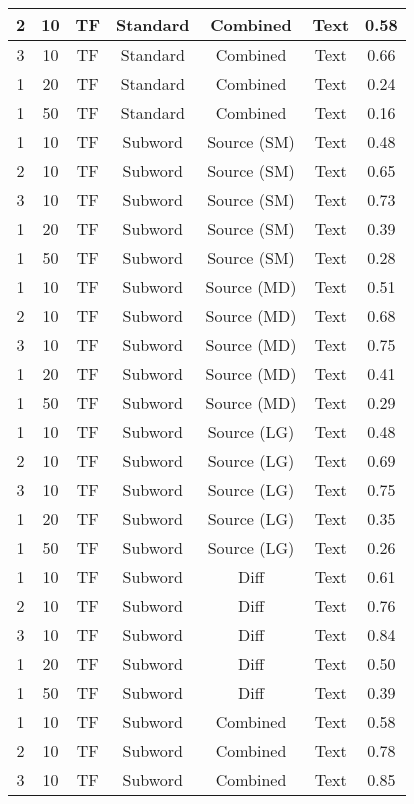 \begin{longtable}{|c|c|c|c|c|c|c|}
\hline
2 & 10 & TF & Standard & Combined & Text & 0.58 \\
\hline
3 & 10 & TF & Standard & Combined & Text & 0.66 \\
\hline
1 & 20 & TF & Standard & Combined & Text & 0.24 \\
\hline
1 & 50 & TF & Standard & Combined & Text & 0.16 \\
\hline
1 & 10 & TF & Subword & Source (SM) & Text & 0.48 \\
\hline
2 & 10 & TF & Subword & Source (SM) & Text & 0.65 \\
\hline
3 & 10 & TF & Subword & Source (SM) & Text & 0.73 \\
\hline
1 & 20 & TF & Subword & Source (SM) & Text & 0.39 \\
\hline
1 & 50 & TF & Subword & Source (SM) & Text & 0.28 \\
\hline
1 & 10 & TF & Subword & Source (MD) & Text & 0.51 \\
\hline
2 & 10 & TF & Subword & Source (MD) & Text & 0.68 \\
\hline
3 & 10 & TF & Subword & Source (MD) & Text & 0.75 \\
\hline
1 & 20 & TF & Subword & Source (MD) & Text & 0.41 \\
\hline
1 & 50 & TF & Subword & Source (MD) & Text & 0.29 \\
\hline
1 & 10 & TF & Subword & Source (LG) & Text & 0.48 \\
\hline
2 & 10 & TF & Subword & Source (LG) & Text & 0.69 \\
\hline
3 & 10 & TF & Subword & Source (LG) & Text & 0.75 \\
\hline
1 & 20 & TF & Subword & Source (LG) & Text & 0.35 \\
\hline
1 & 50 & TF & Subword & Source (LG) & Text & 0.26 \\
\hline
1 & 10 & TF & Subword & Diff & Text & 0.61 \\
\hline
2 & 10 & TF & Subword & Diff & Text & 0.76 \\
\hline
3 & 10 & TF & Subword & Diff & Text & 0.84 \\
\hline
1 & 20 & TF & Subword & Diff & Text & 0.50 \\
\hline
1 & 50 & TF & Subword & Diff & Text & 0.39 \\
\hline
1 & 10 & TF & Subword & Combined & Text & 0.58 \\
\hline
2 & 10 & TF & Subword & Combined & Text & 0.78 \\
\hline
3 & 10 & TF & Subword & Combined & Text & 0.85 \\

\end{longtable}
